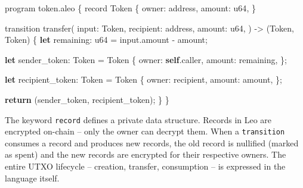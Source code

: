 \documentclass[
  11pt,
  openany]{report}
\newenvironment{Shaded}{\begin{snugshade}}{\end{snugshade}}
\newcommand{\ControlFlowTok}[1]{\textcolor[rgb]{0.62,0.65,1.00}{\textbf{#1}}}
\newcommand{\DataTypeTok}[1]{\textcolor[rgb]{0.75,0.60,1.00}{#1}}
\newcommand{\KeywordTok}[1]{\textcolor[rgb]{0.62,0.65,1.00}{\textbf{#1}}}
\newcommand{\NormalTok}[1]{\textcolor[rgb]{0.78,0.80,0.85}{#1}}
\newcommand{\OperatorTok}[1]{\textcolor[rgb]{0.78,0.80,0.85}{#1}}
\renewcommand{\textbf}[1]{{\bfseries\color{MidnightBold}#1}}
\renewenvironment{Shaded}{%
  \begin{tcolorbox}[
    colback=MidnightCode,
    colframe=MidnightBorder,
    arc=4pt,
    boxrule=0.5pt,
    left=8pt, right=8pt, top=6pt, bottom=6pt,
    breakable, enhanced
  ]%
}{\end{tcolorbox}}
\begin{document}
\begin{Shaded}
\begin{Highlighting}[]
\NormalTok{program token}\OperatorTok{.}\NormalTok{aleo }\OperatorTok{\{}
\NormalTok{    record Token }\OperatorTok{\{}
\NormalTok{        owner}\OperatorTok{:}\NormalTok{ address}\OperatorTok{,}
\NormalTok{        amount}\OperatorTok{:} \DataTypeTok{u64}\OperatorTok{,}
    \OperatorTok{\}}

\NormalTok{    transition transfer(}
\NormalTok{        input}\OperatorTok{:}\NormalTok{ Token}\OperatorTok{,}
\NormalTok{        recipient}\OperatorTok{:}\NormalTok{ address}\OperatorTok{,}
\NormalTok{        amount}\OperatorTok{:} \DataTypeTok{u64}\OperatorTok{,}
\NormalTok{    ) }\OperatorTok{{-}\textgreater{}}\NormalTok{ (Token}\OperatorTok{,}\NormalTok{ Token) }\OperatorTok{\{}
        \KeywordTok{let}\NormalTok{ remaining}\OperatorTok{:} \DataTypeTok{u64} \OperatorTok{=}\NormalTok{ input}\OperatorTok{.}\NormalTok{amount }\OperatorTok{{-}}\NormalTok{ amount}\OperatorTok{;}

        \KeywordTok{let}\NormalTok{ sender\_token}\OperatorTok{:}\NormalTok{ Token }\OperatorTok{=}\NormalTok{ Token }\OperatorTok{\{}
\NormalTok{            owner}\OperatorTok{:} \KeywordTok{self}\OperatorTok{.}\NormalTok{caller}\OperatorTok{,}
\NormalTok{            amount}\OperatorTok{:}\NormalTok{ remaining}\OperatorTok{,}
        \OperatorTok{\};}

        \KeywordTok{let}\NormalTok{ recipient\_token}\OperatorTok{:}\NormalTok{ Token }\OperatorTok{=}\NormalTok{ Token }\OperatorTok{\{}
\NormalTok{            owner}\OperatorTok{:}\NormalTok{ recipient}\OperatorTok{,}
\NormalTok{            amount}\OperatorTok{:}\NormalTok{ amount}\OperatorTok{,}
        \OperatorTok{\};}

        \ControlFlowTok{return}\NormalTok{ (sender\_token}\OperatorTok{,}\NormalTok{ recipient\_token)}\OperatorTok{;}
    \OperatorTok{\}}
\OperatorTok{\}}
\end{Highlighting}
\end{Shaded}

The keyword \texttt{record} defines a private data structure. Records in Leo are
encrypted on-chain -- only the owner can decrypt them. When a
\texttt{transition} consumes a record and produces new records, the old record
is nullified (marked as spent) and the new records are encrypted for their
respective owners. The entire UTXO lifecycle -- creation, transfer, consumption
-- is expressed in the language itself.
\end{document}
